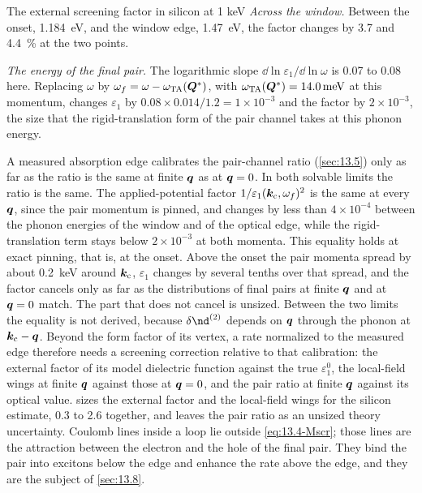\begin{workedexample}{The external screening factor in silicon at 1 keV}
\emph{Across the window.} Between the onset, \SI{1.184}{eV}, and the window edge, \SI{1.47}{eV}, the factor changes by 3.7 and \SI{4.4}{\percent} at the two points.

\emph{The energy of the final pair.} The logarithmic slope $\dd\ln\varepsilon_1/\dd\ln\omega$ is 0.07 to 0.08 here. Replacing $\omega$ by $\omega_f = \omega - \omega_{\mathrm{TA}}(\bm{Q}^*)$, with $\omega_{\mathrm{TA}}(\bm{Q}^*) = \SI{14.0}{meV}$ at this momentum, changes $\varepsilon_1$ by $0.08\times0.014/1.2 = 1\times10^{-3}$ and the factor by $2\times10^{-3}$, the size that the rigid-translation form of the pair channel takes at this phonon energy.
\end{workedexample}

A measured absorption edge calibrates the pair-channel ratio (\cref{sec:13.5}) only as far as the ratio is the same at finite $\bm{q}$ as at $\bm{q} = 0$. In both solvable limits the ratio is the same. The applied-potential factor $1/\varepsilon_1(\bm{k}_{\mathrm{c}},\omega_f)^2$ is the same at every $\bm{q}$, since the pair momentum is pinned, and changes by less than $4\times10^{-4}$ between the phonon energies of the window and of the optical edge, while the rigid-translation term stays below $2\times10^{-3}$ at both momenta. This equality holds at exact pinning, that is, at the onset. Above the onset the pair momenta spread by about \SI{0.2}{keV} around $\bm{k}_{\mathrm{c}}$, $\varepsilon_1$ changes by several tenths over that spread, and the factor cancels only as far as the distributions of final pairs at finite $\bm{q}$ and at $\bm{q} = 0$ match. The part that does not cancel is unsized. Between the two limits the equality is not derived, because $\delta\nd^{(2)}$ depends on $\bm{q}$ through the phonon at $\bm{k}_{\mathrm{c}} - \bm{q}$. Beyond the form factor of its vertex, a rate normalized to the measured edge therefore needs a screening correction relative to that calibration: the external factor of its model dielectric function against the true $\varepsilon_1^0$, the local-field wings at finite $\bm{q}$ against those at $\bm{q} = 0$, and the pair ratio at finite $\bm{q}$ against its optical value.  sizes the external factor and the local-field wings for the silicon estimate, 0.3 to 2.6 together, and leaves the pair ratio as an unsized theory uncertainty. Coulomb lines inside a loop lie outside \cref{eq:13.4-Mscr}; those lines are the attraction between the electron and the hole of the final pair. They bind the pair into excitons below the edge and enhance the rate above the edge, and they are the subject of \cref{sec:13.8}.
